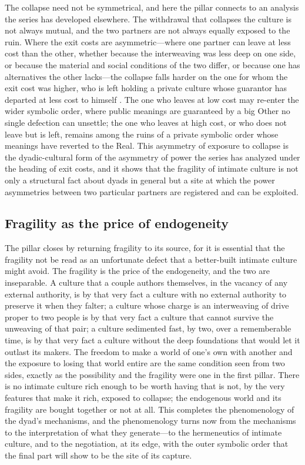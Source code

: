The collapse need not be symmetrical, and here the pillar connects to an analysis the series has developed elsewhere. The withdrawal that collapses the culture is not always mutual, and the two partners are not always equally exposed to the ruin. Where the exit costs are asymmetric---where one partner can leave at less cost than the other, whether because the interweaving was less deep on one side, or because the material and social conditions of the two differ, or because one has alternatives the other lacks---the collapse falls harder on the one for whom the exit cost was higher, who is left holding a private culture whose guarantor has departed at less cost to himself \parencite{paperxvii}. The one who leaves at low cost may re-enter the wider symbolic order, where public meanings are guaranteed by a big Other no single defection can unsettle; the one who leaves at high cost, or who does not leave but is left, remains among the ruins of a private symbolic order whose meanings have reverted to the Real. This asymmetry of exposure to collapse is the dyadic-cultural form of the asymmetry of power the series has analyzed under the heading of exit costs, and it shows that the fragility of intimate culture is not only a structural fact about dyads in general but a site at which the power asymmetries between two particular partners are registered and can be exploited.

\subsection*{Fragility as the price of endogeneity}

The pillar closes by returning fragility to its source, for it is essential that the fragility not be read as an unfortunate defect that a better-built intimate culture might avoid. The fragility is the price of the endogeneity, and the two are inseparable. A culture that a couple authors themselves, in the vacancy of any external authority, is by that very fact a culture with no external authority to preserve it when they falter; a culture whose charge is an interweaving of drive proper to two people is by that very fact a culture that cannot survive the unweaving of that pair; a culture sedimented fast, by two, over a rememberable time, is by that very fact a culture without the deep foundations that would let it outlast its makers. The freedom to make a world of one's own with another and the exposure to losing that world entire are the same condition seen from two sides, exactly as the possibility and the fragility were one in the first pillar. There is no intimate culture rich enough to be worth having that is not, by the very features that make it rich, exposed to collapse; the endogenous world and its fragility are bought together or not at all. This completes the phenomenology of the dyad's mechanisms, and the phenomenology turns now from the mechanisms to the interpretation of what they generate---to the hermeneutics of intimate culture, and to the negotiation, at its edge, with the outer symbolic order that the final part will show to be the site of its capture.
